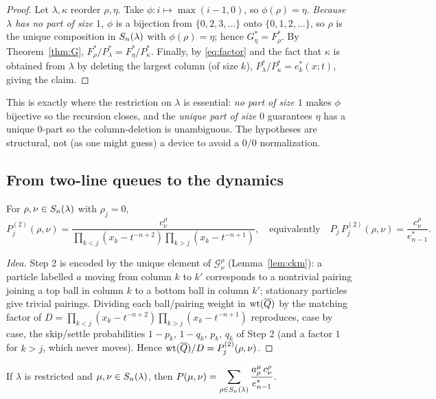 \documentclass[11pt]{article}
\begin{document}
\begin{proof}
Let $\lambda,\kappa$ reorder $\rho,\eta$. Take $\phi:i\mapsto\max(i-1,0)$, so
$\phi(\rho)=\eta$. \emph{Because $\lambda$ has no part of size $1$}, $\phi$ is a
bijection from $\{0,2,3,\dots\}$ onto $\{0,1,2,\dots\}$, so $\rho$ is the unique
composition in $S_n(\lambda)$ with $\phi(\rho)=\eta$; hence $G^*_\eta=F^*_\rho$. By
Theorem~\ref{thm:G},
$F^*_\rho/P^*_\lambda=F^*_\eta/P^*_\kappa$. Finally, by \eqref{eq:factor} and the
fact that $\kappa$ is obtained from $\lambda$ by deleting the largest column (of
size $k$), $P^*_\lambda/P^*_\kappa=e^*_k(x;t)$, giving the claim.
\end{proof}

This is exactly where the restriction on $\lambda$ is essential: \emph{no part of
size $1$} makes $\phi$ bijective so the recursion closes, and the \emph{unique
part of size $0$} guarantees $\eta$ has a unique $0$-part so the column-deletion
is unambiguous. The hypotheses are structural, not (as one might guess) a device
to avoid a $0/0$ normalization.

\subsection*{From two-line queues to the dynamics}

\begin{qthreeproposition}\label{prop:step2}
For $\rho,\nu\in S_n(\lambda)$ with $\rho_j=0$,
\[
P^{(2)}_j(\rho,\nu)=\frac{c^\rho_\nu}{\prod_{k<j}(x_k-t^{-n+2})\prod_{k>j}(x_k-t^{-n+1})},
\quad\text{equivalently}\quad
P_j\,P^{(2)}_j(\rho,\nu)=\frac{c^\rho_\nu}{e^*_{n-1}} .
\]
\end{qthreeproposition}

\begin{proof}[Idea]
Step 2 is encoded by the unique element of $\mathcal G^\rho_\nu$ (Lemma~\ref{lem:ckm}):
a particle labelled $a$ moving from column $k$ to $k'$ corresponds to a
nontrivial pairing joining a top ball in column $k$ to a bottom ball in column
$k'$; stationary particles give trivial pairings. Dividing each ball/pairing
weight in $\operatorname{wt}(\overline Q)$ by the matching factor of
$D=\prod_{k<j}(x_k-t^{-n+2})\prod_{k>j}(x_k-t^{-n+1})$ reproduces, case by case,
the skip/settle probabilities $1-p_k,\,1-q_k,\,p_k,\,q_k$ of Step 2 (and a
factor $1$ for $k>j$, which never moves). Hence $\operatorname{wt}(\overline Q)/D=P^{(2)}_j(\rho,\nu)$.
\end{proof}

\begin{qthreeproposition}\label{prop:transition}
If $\lambda$ is restricted and $\mu,\nu\in S_n(\lambda)$, then
$\displaystyle P(\mu,\nu)=\sum_{\rho\in S_n(\lambda)}\frac{a^\mu_\rho\,c^\rho_\nu}{e^*_{n-1}}$.
\end{qthreeproposition}
\end{document}
